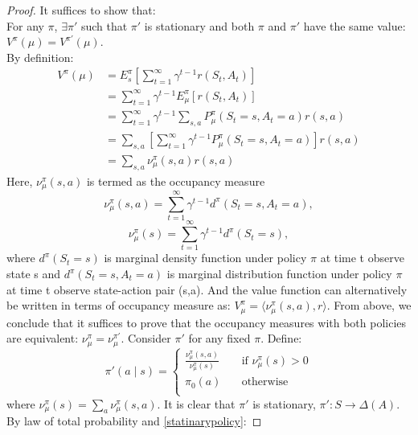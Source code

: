 \documentclass{report}
\begin{document}
\begin{proof}
    It suffices to show that:\\
    For any $\pi$, $\exists \pi'$ such that $\pi'$ is stationary and both $\pi$ and $\pi'$ have the same value: $V^{\pi}(\mu)=V^{\pi'}(\mu)$.\\
    By definition:
    \begin{equation*}
        \begin{split}
            V^{\pi}(\mu)&=E^{\pi}_{s}[\sum_{t=1}^{\infty}\gamma^{t-1}r(S_t,A_t)]\\
            &=\sum_{t=1}^{\infty}\gamma^{t-1}E_{\mu}^{\pi}[r(S_t,A_t)]\\
            &=\sum_{t=1}^{\infty}\gamma^{t-1}\sum_{s,a}P_{\mu}^{\pi}(S_t=s,A_t=a)r(s,a)\\
            &=\sum_{s,a}[\sum_{t=1}^{\infty}\gamma^{t-1}P_{\mu}^{\pi}(S_t=s,A_t=a)]r(s,a)\\
            &=\sum_{s,a}\nu_{\mu}^{\pi}(s,a)r(s,a)
        \end{split}
    \end{equation*}
    Here, $\nu_{\mu}^{\pi}(s,a)$  is termed as the occupancy measure\[
        \nu_{\mu}^{\pi}(s,a)=\sum_{t=1}^{\infty}\gamma^{t-1}d^{\pi}(S_t=s,A_t=a),
    \] \[
        \nu_{\mu}^{\pi}(s)=\sum_{t=1}^{\infty}\gamma^{t-1}d^{\pi}(S_t=s),
    \] where $d^{\pi}(S_t=s)$ is marginal density function under policy $\pi$ at time t observe state s and $d^{\pi}(S_t=s, A_t=a)$ is marginal distribution function under policy $\pi$ at time t observe state-action pair (s,a). And the value function can alternatively be written in terms of occupancy measure as: $V^{\pi}_{\mu}=\langle\nu_{\mu}^{\pi}(s,a),r \rangle$. From above, we conclude that it suffices to prove that the occupancy measures with both policies are equivalent: $\nu_{\mu}^{\pi}=\nu_{\mu}^{\pi'}$. Consider $\pi'$ for any fixed $\pi$. Define: 
    \begin{equation} \label{statinarypolicy}
        \pi'(a\mid s) = 
     \begin{cases}
       \frac{\nu_{\mu}^{\pi}(s,a)}{\nu_{\mu}^{\pi}(s)} &\quad\text{if } \nu_{\mu}^{\pi}(s) > 0\\
       \pi_0(a) &\quad\text{otherwise} \\
     \end{cases}
    \end{equation}
    where $\nu_{\mu}^{\pi}(s)=\sum_{a}\nu_{\mu}^{\pi}(s,a)$. It is clear that $\pi'$ is stationary, $\pi':S\rightarrow \Delta(A)$. By law of total probability and \ref{statinarypolicy}:

\end{proof}
\end{document}
